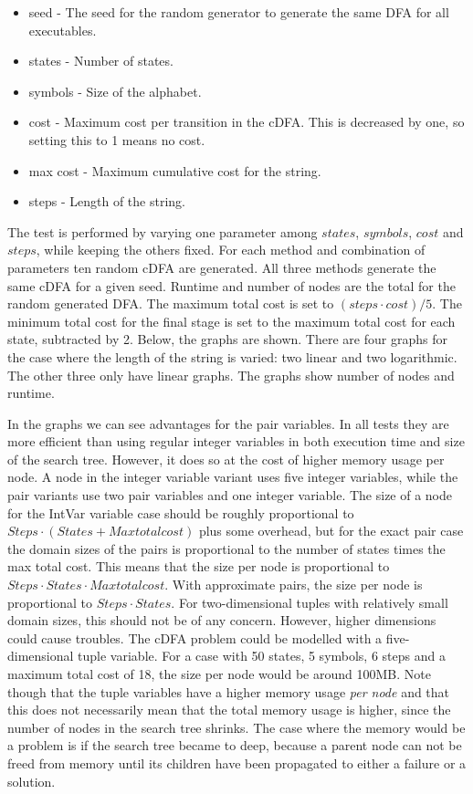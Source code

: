 \documentclass[a4paper,11pt]{article}
\begin{document}
\begin{itemize}
\item{seed} - The seed for the random generator to generate the same DFA for all executables.
\item{states} - Number of states.
\item{symbols} - Size of the alphabet.
\item{cost} - Maximum cost per transition in the cDFA. This is decreased by one, so setting this to 1 means no cost.
\item{max cost} - Maximum cumulative cost for the string.
\item{steps} - Length of the string.
\end{itemize}
The test is performed by varying one parameter among $states$, $symbols$, $cost$ and $steps$, while keeping the others fixed. For each method and combination of parameters ten random cDFA are generated. All three methods generate the same cDFA for a given seed. Runtime and number of nodes are the total for the random generated DFA. The maximum total cost is set to $(steps\cdot cost)/5$. The minimum total cost for the final stage is set to the maximum total cost for each state, subtracted by 2. Below, the graphs are shown. There are four graphs for the case where the length of the string is varied: two linear and two logarithmic. The other three only have linear graphs. The graphs show number of nodes and runtime.






%

In the graphs we can see advantages for the pair variables. In all tests they are more efficient than using regular integer variables in both execution time and size of the search tree. However, it does so at the cost of higher memory usage per node. A node in the integer variable variant uses five integer variables, while the pair variants use two pair variables and one integer variable. The size of a node for the IntVar variable case should be roughly proportional to $Steps\cdot (States + Maxtotalcost)$ plus some overhead, but for the exact pair case the domain sizes of the pairs is proportional to the number of states times the max total cost. This means that the size per node is proportional to $Steps\cdot States\cdot Maxtotalcost$. With approximate pairs, the size per node is proportional to $Steps\cdot States$. For two-dimensional tuples with relatively small domain sizes, this should not be of any concern. However, higher dimensions could cause troubles. The cDFA problem could be modelled with a five-dimensional tuple variable. For a case with 50 states, 5 symbols, 6 steps and a maximum total cost of 18, the size per node would be around 100MB. Note though that the tuple variables have a higher memory usage \textit{per node} and that this does not necessarily mean that the total memory usage is higher, since the number of nodes in the search tree shrinks. The case where the memory would be a problem is if the search tree became to deep, because a parent node can not be freed from memory until its children have been propagated to either a failure or a solution.
\end{document}
